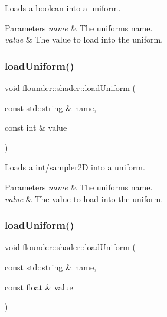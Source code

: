 Loads a boolean into a uniform. 


\begin{DoxyParams}{Parameters}
{\em name} & The uniforms name. \\
\hline
{\em value} & The value to load into the uniform. \\
\hline
\end{DoxyParams}
\mbox{\label{classflounder_1_1shader_a597fdaefa4644b107e8ce2776ce69f76}} 
\subsubsection{\texorpdfstring{load\+Uniform()}{loadUniform()}\hspace{0.1cm}{\footnotesize\ttfamily [2/13]}}
{\footnotesize\ttfamily void flounder\+::shader\+::load\+Uniform (\begin{DoxyParamCaption}\item[{const std\+::string \&}]{name,  }\item[{const int \&}]{value }\end{DoxyParamCaption})}



Loads a int/sampler2D into a uniform. 


\begin{DoxyParams}{Parameters}
{\em name} & The uniforms name. \\
\hline
{\em value} & The value to load into the uniform. \\
\hline
\end{DoxyParams}
\mbox{\label{classflounder_1_1shader_acd349b44107fc3389856a124da305d62}} 
\subsubsection{\texorpdfstring{load\+Uniform()}{loadUniform()}\hspace{0.1cm}{\footnotesize\ttfamily [3/13]}}
{\footnotesize\ttfamily void flounder\+::shader\+::load\+Uniform (\begin{DoxyParamCaption}\item[{const std\+::string \&}]{name,  }\item[{const float \&}]{value }\end{DoxyParamCaption})}



